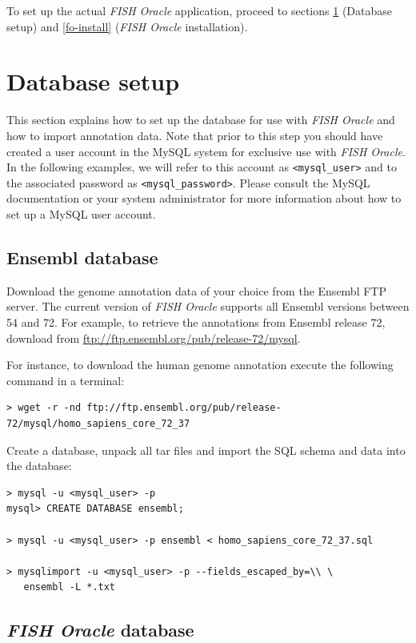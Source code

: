 \documentclass[11pt,final]{article}
\newcommand{\FO}[0]{\emph{FISH Oracle}\xspace}
\begin{document}
To set up the actual \FO application, proceed to sections \ref{db-setup}
(Database setup) and \ref{fo-install} (\FO installation).

\section{Database setup}
\label{db-setup}

This section explains how to set up the database for use with \FO and how to
import annotation data. Note that prior to this step you should have created a
user account in the MySQL system for exclusive use with \FO. In the following
examples, we will refer to this account as \texttt{<mysql\_user>} and to the
associated password as \texttt{<mysql\_password>}. Please consult the MySQL
documentation or your system administrator for more information about how to
set up a MySQL user account.

\subsection{Ensembl database}

Download the genome annotation data of your choice from the Ensembl FTP server.
The current version of \FO supports all Ensembl versions between 54
and 72. For example, to retrieve the annotations from Ensembl release 72,
download from \url{ftp://ftp.ensembl.org/pub/release-72/mysql}.

For instance, to download the human genome annotation execute the following
command in a terminal:

\begin{lstlisting}
> wget -r -nd ftp://ftp.ensembl.org/pub/release-72/mysql/homo_sapiens_core_72_37
\end{lstlisting}

Create a database, unpack all tar files and import the SQL schema and data
into the database:

\begin{lstlisting}
> mysql -u <mysql_user> -p
mysql> CREATE DATABASE ensembl;

> mysql -u <mysql_user> -p ensembl < homo_sapiens_core_72_37.sql

> mysqlimport -u <mysql_user> -p --fields_escaped_by=\\ \
   ensembl -L *.txt
\end{lstlisting}

\subsection{\FO database}
\end{document}
